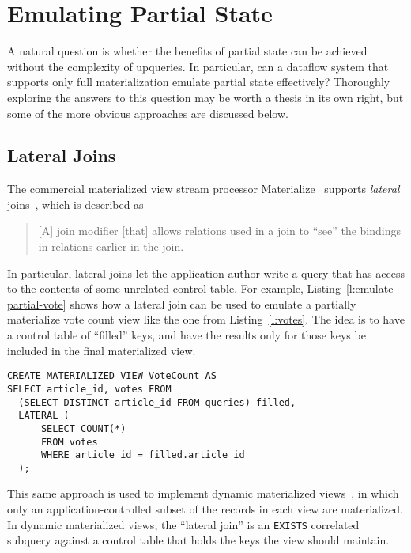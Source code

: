 \section{Emulating Partial State}
\label{s:disc:emulating}

A natural question is whether the benefits of partial state can be achieved
without the complexity of upqueries. In particular, can a dataflow system that
supports only full materialization emulate partial state effectively? Thoroughly
exploring the answers to this question may be worth a thesis in its own right,
but some of the more obvious approaches are discussed below.

\subsection{Lateral Joins}

The commercial materialized view stream processor Materialize~\cite{materialize}
supports \emph{lateral} joins~\cite{lateral-join}, which is described as

\begin{quote}
  [A] join modifier [that] allows relations used in a join to ``see'' the
  bindings in relations earlier in the join.
\end{quote}

In particular, lateral joins let the application author write a query that has
access to the contents of some unrelated control table. For example,
Listing~\vref{l:emulate-partial-vote} shows how a lateral join can be used to
emulate a partially materialize vote count view like the one from
Listing~\vref{l:votes}. The idea is to have a control table of ``filled'' keys,
and have the results only for those keys be included in the final materialized
view.

\begin{listing}[h]
  \begin{verbatim}
CREATE MATERIALIZED VIEW VoteCount AS
SELECT article_id, votes FROM
  (SELECT DISTINCT article_id FROM queries) filled,
  LATERAL (
      SELECT COUNT(*)
      FROM votes
      WHERE article_id = filled.article_id
  );
  \end{verbatim}
  \caption{Using a Materialize lateral join to emulate partial state in vote.}
  \label{l:emulate-partial-vote}
\end{listing}

This same approach is used to implement dynamic materialized
views~\cite{dynamic-materialized-views, partially-materialized-views}, in which
only an application-controlled subset of the records in each view are
materialized. In dynamic materialized views, the ``lateral join'' is an
\texttt{EXISTS} correlated subquery against a control table that holds the keys
the view should maintain.


